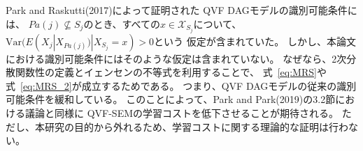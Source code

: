 Park and Raskutti(2017)\cite{Park2017-hw}によって証明された
QVF DAGモデルの識別可能条件には、
$Pa(j) \nsubseteq S_j$のとき、すべての$x \in \mathcal X_{S_j}$について、
$\mathrm{Var}(E(X_j | X_{Pa(j)}) | X_{S_j} = x) > 0$という
仮定が含まれていた。
しかし、本論文における識別可能条件にはそのような仮定は含まれていない。
なぜなら、2次分散関数性の定義とイェンセンの不等式を利用することで、
式~\eqref{eq:MRS}や式~\eqref{eq:MRS_2}が成立するためである。
つまり、QVF DAGモデルの従来の識別可能条件\cite{Park2017-hw}を緩和している。
このことによって、Park and Park(2019)\cite{Park2019-qy}の3.2節における議論と同様に
QVF-SEMの学習コストを低下させることが期待される。
ただし、本研究の目的から外れるため、学習コストに関する理論的な証明は行わない。
